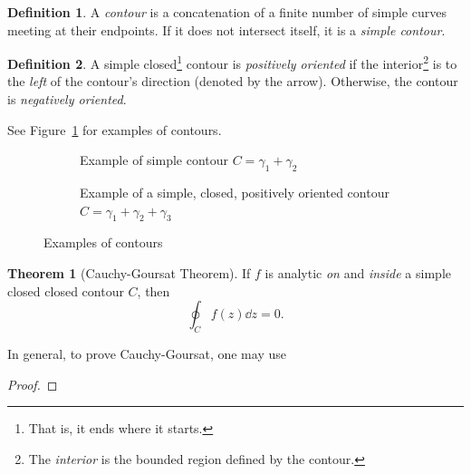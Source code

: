 \documentclass[10pt]{scrartcl}
\numberwithin{equation}{subsection}
\theoremstyle{definition}
\newtheorem{definition}{Definition}[section]
\newtheorem{theorem}{Theorem}[section]
\theoremstyle{remark}
\newenvironment{definitionSR}
	{
		\begin{siderules}
			\begin{definition}
			}
			{
			\end{definition}
		\end{siderules}
	}
\newenvironment{theoremSR}
	{
		\begin{siderules}
			\begin{theorem}
			}
			{
			\end{theorem}
		\end{siderules}
	}
\begin{document}
\begin{definitionSR}
A \textit{contour} is a concatenation of a finite number 
of simple curves meeting at their endpoints. If it does not intersect 
itself, it is a \textit{simple contour}.
\end{definitionSR}
\begin{definitionSR}
	A simple closed\footnote{That is, it ends where it starts.} contour is 
	\textit{positively oriented} if the interior\footnote{The \textit{interior} 
	is the bounded region defined by the contour.} is to the \emph{left} of the 
	contour's direction (denoted by the arrow). Otherwise, the contour is 
	\textit{negatively oriented}.
\end{definitionSR}
See Figure~\ref{fig:contours} for examples of contours.
\begin{figure}[h]
\centering
\begin{subfigure}[b]{.4\textwidth}
\caption{Example of simple contour $C=\gamma_1 + \gamma_2$}
\end{subfigure}
\begin{subfigure}[b]{.4\textwidth}
\caption{Example of a simple, closed, positively oriented contour $C=\gamma_1 + \gamma_2 + \gamma_3$}
\end{subfigure}
\caption{Examples of contours}
\label{fig:contours}
\end{figure}
\begin{theoremSR}[Cauchy-Goursat Theorem]
	If $f$ is analytic \emph{on} and \emph{inside} a simple closed closed
	contour $C$, then
	\[
		\oint_C f(z)\dd{z} = 0.
	\]
\end{theoremSR}
In general, to prove Cauchy-Goursat, one may use
\begin{proof}
\end{proof}
\end{document}
